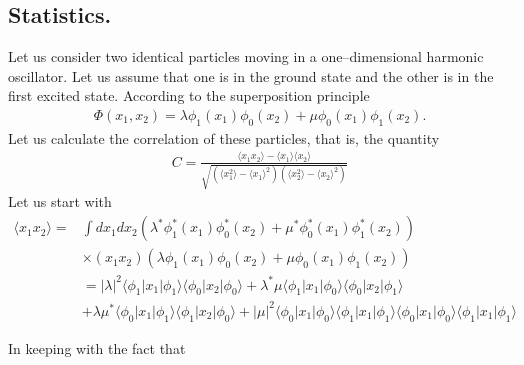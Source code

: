 \begin{subappendices}
   

\section{Statistics.}\label{App6G}
Let us consider two identical particles moving in a one--dimensional harmonic oscillator. Let us assume  that one is in the ground state and the other  is in the first excited state. According to the superposition principle 
\begin{align}\label{eqApp6G1}
\Phi(x_1,x_2)=\lambda\phi_1(x_1)\phi_0(x_2)+\mu\phi_0(x_1)\phi_1(x_2).
\end{align} 
Let us calculate the correlation of these particles, that is, the quantity
\begin{align}\label{eqApp6G2}
C=\frac{\langle x_1x_2\rangle-\langle x_1\rangle\langle x_2\rangle}{\sqrt{\left(\langle x_1^2\rangle-\langle x_1\rangle^2\right)\left(\langle x_2^2\rangle-\langle x_2\rangle^2\right)}}
\end{align} 
Let us start with
\begin{align}\label{eqApp63}
\nonumber\langle x_1x_2\rangle=&\int dx_1 dx_2 \left(\lambda^*\phi_1^*(x_1)\phi_0^*(x_2)+\mu^*\phi_0^*(x_1)\phi_1^*(x_2)\right)\\
\nonumber&\times(x_1 x_2)\left(\lambda\phi_1(x_1)\phi_0(x_2)+\mu\phi_0(x_1)\phi_1(x_2)\right)\\
\nonumber &=|\lambda|^2\langle\phi_1|x_1|\phi_1\rangle\langle\phi_0|x_2|\phi_0\rangle+\lambda^*\mu\langle\phi_1|x_1|\phi_0\rangle\langle\phi_0|x_2|\phi_1\rangle\\
&+\lambda\mu^*\langle\phi_0|x_1|\phi_1\rangle\langle\phi_1|x_2|\phi_0\rangle+|\mu|^2\langle\phi_0|x_1|\phi_0\rangle\langle\phi_1|x_1|\phi_1\rangle\langle\phi_0|x_1|\phi_0\rangle\langle\phi_1|x_1|\phi_1\rangle
\end{align} 

In keeping with the fact that


\end{subappendices}
